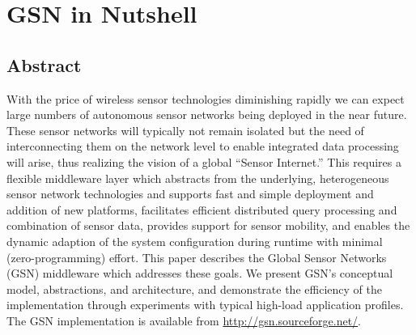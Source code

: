 \chapter{GSN in Nutshell}%


\section*{Abstract}
  With the price of wireless sensor technologies diminishing rapidly we can
  expect large numbers of autonomous sensor networks being deployed in the near
  future. These sensor networks will typically not remain isolated but the need
  of interconnecting them on the network level to enable integrated data
  processing will arise, thus realizing the vision of a global ``Sensor
  Internet.'' This requires a flexible middleware layer which abstracts from
  the underlying, heterogeneous sensor network technologies and supports fast
  and simple deployment and addition of new platforms, facilitates efficient
  distributed query processing and combination of sensor data, provides support
  for sensor mobility, and enables the dynamic adaption of the system
  configuration during runtime with minimal (zero-programming) effort. This
  paper describes the Global Sensor Networks (GSN) middleware which addresses
  these goals. We present GSN's conceptual model, abstractions, and
  architecture, and demonstrate the efficiency of the implementation through
  experiments with typical high-load application profiles. The GSN
  implementation is available from \url{http://gsn.sourceforge.net/}.
\newpage
